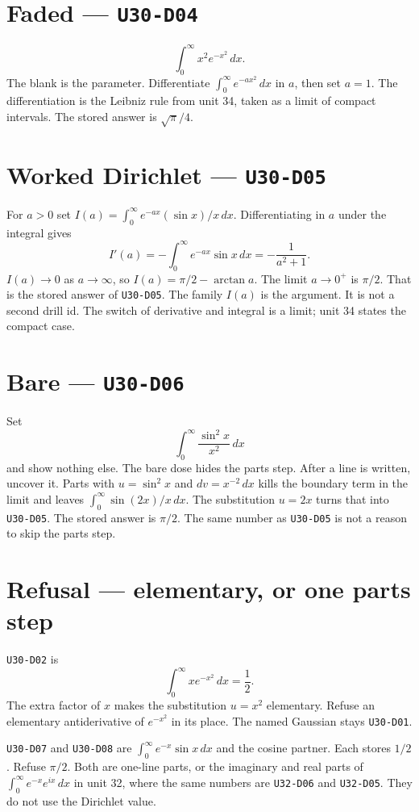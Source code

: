 \section{Faded --- \texttt{U30-D04}}
\[
\int_0^{\infty}x^2 e^{-x^2}\,dx.
\]
The blank is the parameter. Differentiate $\int_0^{\infty}e^{-a x^2}\,dx$ in $a$, then set $a=1$. The differentiation is the Leibniz rule from unit 34, taken as a limit of compact intervals. The stored answer is $\sqrt{\pi}/4$.

\section{Worked Dirichlet --- \texttt{U30-D05}}
For $a>0$ set $I(a)=\int_0^{\infty}e^{-ax}(\sin x)/x\,dx$. Differentiating in $a$ under the integral gives
\[
I'(a)=-\int_0^{\infty}e^{-ax}\sin x\,dx=-\frac{1}{a^2+1}.
\]
$I(a)\to 0$ as $a\to\infty$, so $I(a)=\pi/2-\arctan a$. The limit $a\to 0^+$ is $\pi/2$. That is the stored answer of \texttt{U30-D05}. The family $I(a)$ is the argument. It is not a second drill id. The switch of derivative and integral is a limit; unit 34 states the compact case.

\section{Bare --- \texttt{U30-D06}}
Set
\[
\int_0^{\infty}\frac{\sin^2 x}{x^2}\,dx
\]
and show nothing else. The bare dose hides the parts step. After a line is written, uncover it. Parts with $u=\sin^2 x$ and $dv=x^{-2}\,dx$ kills the boundary term in the limit and leaves $\int_0^{\infty}\sin(2x)/x\,dx$. The substitution $u=2x$ turns that into \texttt{U30-D05}. The stored answer is $\pi/2$. The same number as \texttt{U30-D05} is not a reason to skip the parts step.

\section{Refusal --- elementary, or one parts step}
\texttt{U30-D02} is
\[
\int_0^{\infty}x e^{-x^2}\,dx=\frac12.
\]
The extra factor of $x$ makes the substitution $u=x^2$ elementary. Refuse an elementary antiderivative of $e^{-x^2}$ in its place. The named Gaussian stays \texttt{U30-D01}.

\texttt{U30-D07} and \texttt{U30-D08} are $\int_0^{\infty}e^{-x}\sin x\,dx$ and the cosine partner. Each stores $1/2$. Refuse $\pi/2$. Both are one-line parts, or the imaginary and real parts of $\int_0^{\infty}e^{-x}e^{ix}\,dx$ in unit 32, where the same numbers are \texttt{U32-D06} and \texttt{U32-D05}. They do not use the Dirichlet value.

